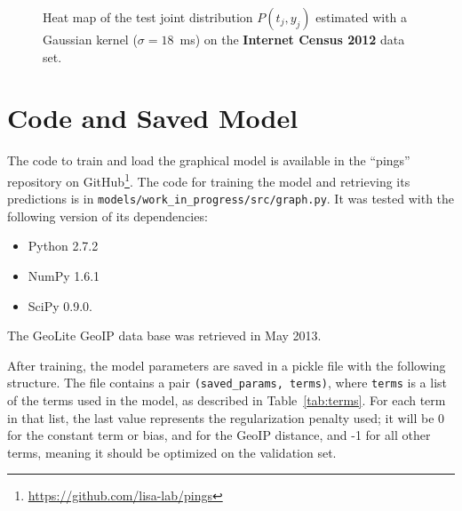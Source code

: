 \documentclass[10pt,a4paper,notitlepage,twocolumn]{article}
\begin{document}
\begin{figure}
\caption{Heat map of the test joint distribution $P(t_j,y_j)$ estimated with a Gaussian kernel ($\sigma=18$~ms) on the {\bf Internet Census 2012} data set.}
\label{fig:ic2012_2d}
\end{figure}

\section{Code and Saved Model}

The code to train and load the graphical model
is available in the ``pings'' repository on
GitHub\footnote{\url{https://github.com/lisa-lab/pings}}. The code
for training the model and retrieving its predictions is in
\verb|models/work_in_progress/src/graph.py|. It was tested with the following
version of its dependencies:
\begin{itemize}
  \item Python 2.7.2
  \item NumPy 1.6.1
  \item SciPy 0.9.0.
\end{itemize}
The GeoLite GeoIP data base was retrieved in May 2013.

After training, the model parameters are saved in a pickle file with
the following structure. The file contains a pair
\verb|(saved_params, terms)|, where \verb|terms| is a list of the terms
used in the model, as described in Table~\ref{tab:terms}. For each term
in that list, the last value represents the regularization penalty
used; it will be 0 for the constant term or bias, and for the GeoIP
distance, and -1 for all other terms, meaning it should be optimized on
the validation set.
\end{document}
